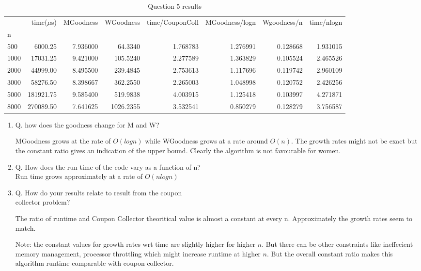\documentclass{homeworg}
\begin{document}
\begin{table}
\centering
\caption{Question 5 results}
\label{table:q5}
\small\addtolength{\tabcolsep}{-1pt}
\begin{tabular}{lrrrrrrr}
\toprule
{} &  time($\mu$s) &  MGoodness &  WGoodness &  time/CouponColl &  MGoodness/logn &  Wgoodness/n &  time/nlogn \\
n    &              &            &            &                              &                 &              &             \\
\midrule
500  &      6000.25 &   7.936000 &    64.3340 &                     1.768783 &        1.276991 &     0.128668 &    1.931015 \\
1000 &     17031.25 &   9.421000 &   105.5240 &                     2.277589 &        1.363829 &     0.105524 &    2.465526 \\
2000 &     44999.00 &   8.495500 &   239.4845 &                     2.753613 &        1.117696 &     0.119742 &    2.960109 \\
3000 &     58276.50 &   8.398667 &   362.2550 &                     2.265003 &        1.048998 &     0.120752 &    2.426256 \\
5000 &    181921.75 &   9.585400 &   519.9838 &                     4.003915 &        1.125418 &     0.103997 &    4.271871 \\
8000 &    270089.50 &   7.641625 &  1026.2355 &                     3.532541 &        0.850279 &     0.128279 &    3.756587 \\
\bottomrule
\end{tabular}
\end{table}

\begin{enumerate}
    \item Q. how does the goodness change for M and W?

MGoodness grows at the rate of $O(logn)$ while WGoodness grows at a rate around $O(n)$. The growth rates might not be exact but the constant ratio gives an indication of the upper bound. Clearly the algorithm is not favourable for women.

    \item Q. How does the run time of the code vary as a function of n?\\

Run time grows approximately at a rate of $O(n log n )$

    \item Q. How do your results relate to result from the coupon\\ collector problem?

The ratio of runtime and Coupon Collector theoritical value is almost a constant at every n. Approximately the growth rates seem to match. 

Note: the constant values for growth rates wrt time are slightly higher for higher $n$. But there can be other constraints like ineffecient memory management, processor throttling which might increase runtime at higher $n$. But the overall constant ratio makes this algorithm runtime comparable with coupon collector. 
\end{enumerate}
\end{document}
